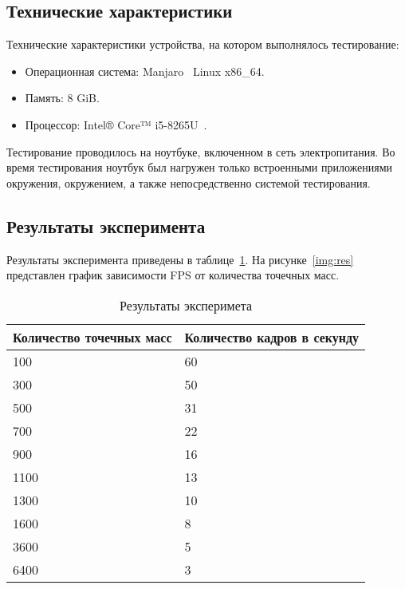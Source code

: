 \subsection{Технические характеристики}

Технические характеристики устройства, на котором выполнялось тестирование:

\begin{itemize}
	\item Операционная система: Manjaro~\cite{manjaro} Linux x86\_64.
	\item Память: 8 GiB.
	\item Процессор: Intel® Core™ i5-8265U~\cite{intel}.
\end{itemize}

Тестирование проводилось на ноутбуке, включенном в сеть электропитания. Во
время тестирования ноутбук был нагружен только встроенными приложениями
окружения, окружением, а также непосредственно системой тестирования.

\subsection{Результаты эксперимента}

Результаты эксперимента приведены в таблице~\ref{tab:01}. На
рисунке~\ref{img:res} представлен график зависимости FPS от количества точечных
масс.

\noindent
\captionsetup{format=hang,justification=raggedright,
              singlelinecheck=off,width=14cm}
\begin{longtable}[Hc]{|l|l|}
\caption{Результаты эксперимета\label{tab:01}}\\
    \hline
    \multicolumn{1}{|c}{\textbf{Количество точечных масс}}
    &
    \multicolumn{1}{|c|}{\textbf{Количество кадров в секунду}}\\
    \hline
    100 & 60 \\
    \hline
    300 & 50 \\
    \hline
    500 & 31 \\
    \hline
    700 & 22 \\
    \hline
    900 & 16 \\
    \hline
    1100 & 13 \\
    \hline
    1300 & 10 \\
    \hline
    1600 & 8 \\
    \hline
    3600 & 5 \\
    \hline
    6400 & 3 \\
    \hline
\end{longtable}


